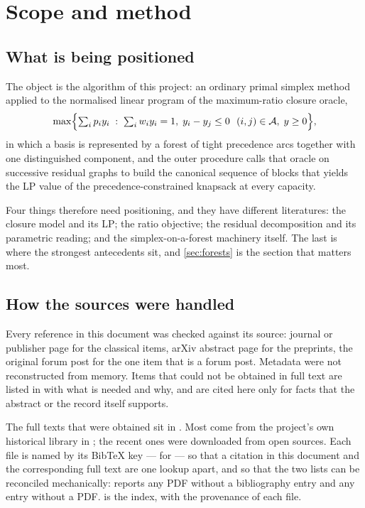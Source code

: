 \section{Scope and method}\label{sec:scope}

\subsection{What is being positioned}

The object is the \FS{} algorithm of this project: an ordinary primal simplex
method applied to the normalised linear program of the maximum-ratio closure
oracle,
\[
\max\Bigl\{\textstyle\sum_i p_i y_i \;:\; \sum_i w_i y_i = 1,\;
y_i - y_j \le 0\ \ (i,j)\in\mathcal A,\; y \ge 0 \Bigr\},
\]
in which a basis is represented by a forest of tight precedence arcs together
with one distinguished component, and the outer procedure calls that oracle on
successive residual graphs to build the canonical sequence of blocks that
yields the LP value of the precedence-constrained knapsack at every capacity.

Four things therefore need positioning, and they have different literatures:
the closure model and its LP; the ratio objective; the residual decomposition
and its parametric reading; and the simplex-on-a-forest machinery itself. The
last is where the strongest antecedents sit, and \cref{sec:forests} is the
section that matters most.

\subsection{How the sources were handled}

Every reference in this document was checked against its source: journal or
publisher page for the classical items, arXiv abstract page for the preprints,
the original forum post for the one item that is a forum post. Metadata were not
reconstructed from memory. Items that could not be obtained in full text are
listed in  with what is needed and why, and are
cited here only for facts that the abstract or the record itself supports.

The full texts that were obtained sit in . Most come
from the project's own historical library in ; the
recent ones were downloaded from open sources. Each file is named by its BibTeX
key ---  for \citet{Yang2026} --- so that a citation in this
document and the corresponding full text are one lookup apart, and so that the
two lists can be reconciled mechanically:  reports any
PDF without a bibliography entry and any entry without a PDF.
 is the index, with the provenance of each
file.

